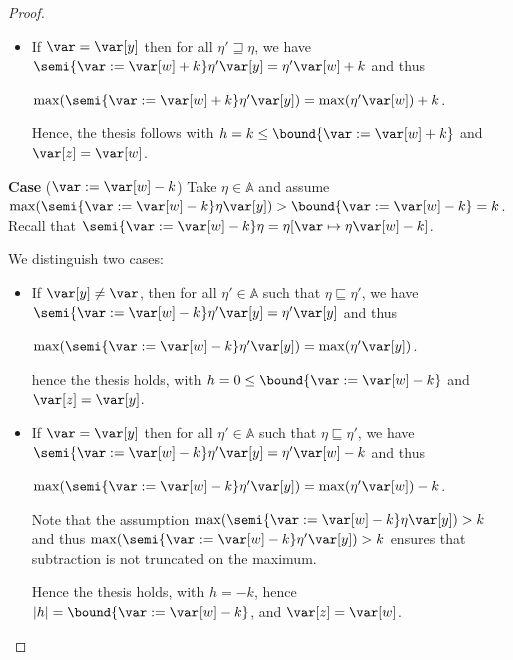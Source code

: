 \begin{proof}
\begin{itemize}
  \item 
    If \(\var = \var[y]\) then  for all \(\eta' \sqsupseteq \eta\), we have
    \(\semi{\var := \var[w] + k}\eta' \var[y] = \eta' \var[w] +
    k\) and thus
    \begin{center}
      \(\max(\semi{\var := \var[w] + k}\eta' \var[y]) = \max(\eta' \var[w]) +
      k\).
    \end{center}
    
    Hence, the thesis follows with \(h = k \leq \bound{\var := \var[w] + k}\)
    and \(\var[z] = \var[w]\).
  \end{itemize}
  

  
  \medskip
  
  \noindent
  \textbf{Case} (\(\var := \var[w] - k\))
  Take \(\eta \in \mathbb{A}\) and assume
  \(\max(\semi{\var := \var[w] - k}\eta \var[y]) > \bound{\var := \var[w] - k} = k\).
  Recall that
  \(\semi{\var := \var[w] - k}\eta = \eta[\var \mapsto \eta \var[w] - k]\).
  
  We distinguish two cases:
  \begin{itemize}
    
  \item If \(\var[y] \neq \var\), then for all
    \(\eta' \in \mathbb{A}\) such that
    \(\eta \sqsubseteq \eta'\), we have
    \(\semi{\var := \var[w] - k}\eta' \var[y] = \eta' \var[y]\) and thus
    \begin{center}
      \(\max(\semi{\var := \var[w] - k}\eta' \var[y]) = \max(\eta' \var[y])\).
    \end{center}
    hence the thesis holds, with
    \(h =0 \leq \bound{\var := \var[w] - k}\) and \(\var[z] = \var[y]\).
    
  \item If \(\var = \var[y]\) then for all \(\eta' \in \mathbb{A}\) such
    that \(\eta \sqsubseteq \eta'\), we have
    \(\semi{\var := \var[w] - k}\eta' \var[y] = \eta' \var[w] - k\) and
    thus
    \begin{center}
      \(\max(\semi{\var := \var[w] - k}\eta' \var[y]) = \max(\eta' \var[w]) -
      k\).
    \end{center}
    Note that the assumption \(\max(\semi{\var := \var[w] - k}\eta \var[y]) > k\) and thus
    \(\max(\semi{\var := \var[w] - k}\eta' \var[y]) > k\) ensures that subtraction is not
    truncated on the maximum.
    
    Hence the thesis holds, with \(h = -k\), hence \(|h| = \bound{\var := \var[w] - k}\),
    and \(\var[z] = \var[w]\).
  \end{itemize}
  

\end{proof}
